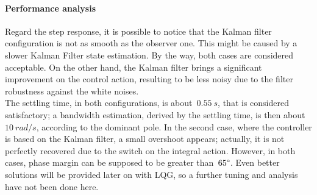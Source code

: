 \paragraph{Performance analysis}
Regard the step response, it is possible to notice that the Kalman filter configuration is not as smooth as the observer one. This might be caused by a slower Kalman Filter state estimation. By the way, both cases are considered acceptable. On the other hand, the Kalman filter brings a significant improvement on the control action, resulting to be less noisy due to the filter robustness against the white noises. \\

The settling time, in both configurations, is about~$0.55\ s$, that is considered satisfactory; a bandwidth estimation, derived by the settling time, is then about~$10\ rad/s$, according to the dominant pole. In the second case, where the controller is based on the Kalman filter, a small overshoot appears; actually, it is not perfectly recovered due to the switch on the integral action.
However, in both cases, phase margin can be supposed to be greater than~$65\degree$.
Even better solutions will be provided later on with LQG, so a further tuning and analysis have not been done here.
\newpage
